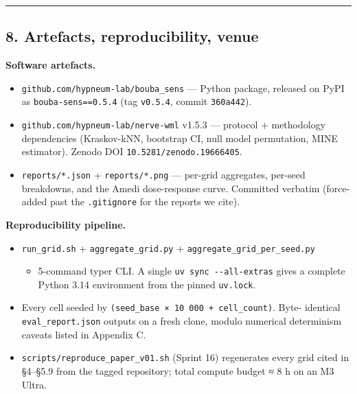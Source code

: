 \documentclass[
]{article}
\providecommand{\tightlist}{%
  \setlength{\itemsep}{0pt}\setlength{\parskip}{0pt}}
\begin{document}
\begin{center}\rule{0.5\linewidth}{0.5pt}\end{center}

\subsection{8. Artefacts, reproducibility,
venue}\label{8-artefacts-reproducibility-venue}

\textbf{Software artefacts.}

\begin{itemize}
\tightlist
\item
  \texttt{github.com/hypneum-lab/bouba\_sens} --- Python package,
  released on PyPI as \texttt{bouba-sens==0.5.4} (tag \texttt{v0.5.4},
  commit \texttt{360a442}).
\item
  \texttt{github.com/hypneum-lab/nerve-wml} v1.5.3 --- protocol +
  methodology dependencies (Kraskov-kNN, bootstrap CI, null model
  permutation, MINE estimator). Zenodo DOI
  \texttt{10.5281/zenodo.19666405}.
\item
  \texttt{reports/*.json} + \texttt{reports/*.png} --- per-grid
  aggregates, per-seed breakdowns, and the Amedi dose-response curve.
  Committed verbatim (force-added past the \texttt{.gitignore} for the
  reports we cite).
\end{itemize}

\textbf{Reproducibility pipeline.}

\begin{itemize}
\tightlist
\item
  \texttt{run\_grid.sh} + \texttt{aggregate\_grid.py} +
  \texttt{aggregate\_grid\_per\_seed.py}

  \begin{itemize}
  \tightlist
  \item
    5-command typer CLI. A single \texttt{uv\ sync\ -\/-all-extras}
    gives a complete Python 3.14 environment from the pinned
    \texttt{uv.lock}.
  \end{itemize}
\item
  Every cell seeded by
  \texttt{(seed\_base\ ×\ 10\ 000\ +\ cell\_count)}. Byte- identical
  \texttt{eval\_report.json} outputs on a fresh clone, modulo numerical
  determinism caveats listed in Appendix C.
\item
  \texttt{scripts/reproduce\_paper\_v01.sh} (Sprint 16) regenerates
  every grid cited in §4--§5.9 from the tagged repository; total compute
  budget ≈ 8 h on an M3 Ultra.
\end{itemize}
\end{document}
